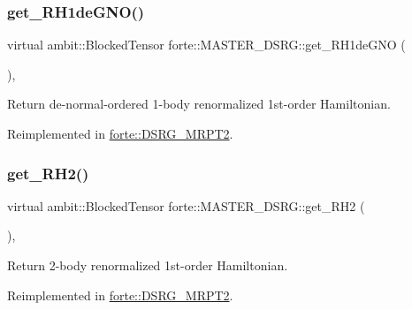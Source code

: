 \subsubsection{\texorpdfstring{get\+\_\+\+R\+H1de\+G\+N\+O()}{get\_RH1deGNO()}}
{\footnotesize\ttfamily virtual ambit\+::\+Blocked\+Tensor forte\+::\+M\+A\+S\+T\+E\+R\+\_\+\+D\+S\+R\+G\+::get\+\_\+\+R\+H1de\+G\+NO (\begin{DoxyParamCaption}{ }\end{DoxyParamCaption})\hspace{0.3cm}{\ttfamily [inline]}, {\ttfamily [virtual]}}



Return de-\/normal-\/ordered 1-\/body renormalized 1st-\/order Hamiltonian. 



Reimplemented in \mbox{\hyperlink{classforte_1_1_d_s_r_g___m_r_p_t2_ab5efb73cb6a375af7f41822df5476036}{forte\+::\+D\+S\+R\+G\+\_\+\+M\+R\+P\+T2}}.

\mbox{\label{classforte_1_1_m_a_s_t_e_r___d_s_r_g_a4f300dd1d54dfe45f8db603a62f58b0e}} 
\subsubsection{\texorpdfstring{get\+\_\+\+R\+H2()}{get\_RH2()}}
{\footnotesize\ttfamily virtual ambit\+::\+Blocked\+Tensor forte\+::\+M\+A\+S\+T\+E\+R\+\_\+\+D\+S\+R\+G\+::get\+\_\+\+R\+H2 (\begin{DoxyParamCaption}{ }\end{DoxyParamCaption})\hspace{0.3cm}{\ttfamily [inline]}, {\ttfamily [virtual]}}



Return 2-\/body renormalized 1st-\/order Hamiltonian. 



Reimplemented in \mbox{\hyperlink{classforte_1_1_d_s_r_g___m_r_p_t2_a9384e3028a6648b40ae605261ce12db9}{forte\+::\+D\+S\+R\+G\+\_\+\+M\+R\+P\+T2}}.

\mbox{\label{classforte_1_1_m_a_s_t_e_r___d_s_r_g_a7eef5849acfd3aec1a2fbc5f981a5538}} 
